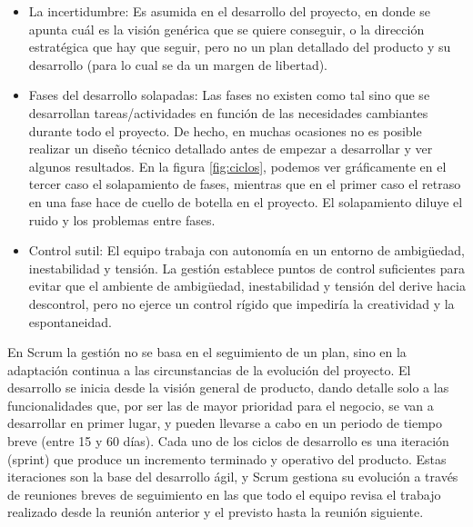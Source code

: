 \begin{itemize}
\item La incertidumbre: Es asumida en el desarrollo del proyecto, en donde se apunta cuál es la visión genérica que se quiere conseguir, o la dirección estratégica que hay que seguir, pero no un plan detallado del producto y su desarrollo (para lo cual se da un margen de libertad).
\item Fases del desarrollo solapadas: Las fases no existen como tal sino que se desarrollan tareas/actividades en función de las necesidades cambiantes durante todo el proyecto. De hecho, en muchas ocasiones no es posible realizar un diseño técnico detallado antes de empezar a desarrollar y ver algunos resultados. En la figura \ref{fig:ciclos}, podemos ver gráficamente en el tercer caso el solapamiento de fases, mientras que en el primer caso el retraso en una fase hace de cuello de botella en el proyecto. El solapamiento diluye el ruido y los problemas entre fases.
\item Control sutil: El equipo trabaja con autonomía en un entorno de ambigüedad, inestabilidad y tensión. La gestión establece puntos de control suficientes para evitar que el ambiente de ambigüedad, inestabilidad y tensión del derive hacia descontrol, pero no ejerce un control rígido que impediría la creatividad y la espontaneidad.
\end{itemize}

En Scrum la gestión no se basa en el seguimiento de un plan, sino en la adaptación continua a las circunstancias de la evolución del proyecto. El desarrollo se inicia desde la visión general de producto, dando detalle  solo a las funcionalidades que, por ser las de mayor prioridad para el negocio, se van a desarrollar en primer lugar, y pueden llevarse a cabo en un periodo de tiempo breve (entre 15 y 60 días). Cada uno de los ciclos de desarrollo es una iteración (sprint) que produce un incremento terminado y operativo del producto. Estas iteraciones son la base del desarrollo ágil, y Scrum gestiona su evolución a través de reuniones breves de seguimiento en las que todo el equipo revisa el trabajo realizado desde la reunión anterior y el previsto hasta la reunión siguiente.

